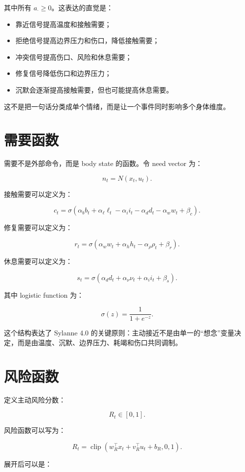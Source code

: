 \documentclass[UTF8,12pt]{ctexart}
\begin{document}
其中所有 $a_{\cdot}\geq 0$。这表达的直觉是：

\begin{itemize}
  \item 靠近信号提高温度和接触需要；
  \item 拒绝信号提高边界压力和伤口，降低接触需要；
  \item 冲突信号提高伤口、风险和休息需要；
  \item 修复信号降低伤口和边界压力；
  \item 沉默会逐渐提高接触需要，但也可能提高休息需要。
\end{itemize}

这不是把一句话分类成单个情绪，而是让一个事件同时影响多个身体维度。

\section{需要函数}

需要不是外部命令，而是 body state 的函数。令 need vector 为：

\[
n_t=N(x_t,u_t).
\]

接触需要可以定义为：

\[
c_t=\sigma\left(\alpha_b b_t+\alpha_\ell\ell_t-\alpha_i i_t-\alpha_d d_t-\alpha_w w_t+\beta_c\right).
\]

修复需要可以定义为：

\[
r_t=\sigma\left(\alpha_w w_t+\alpha_h h_t-\alpha_\rho\rho_t+\beta_r\right).
\]

休息需要可以定义为：

\[
s_t=\sigma\left(\alpha_d d_t+\alpha_\nu\nu_t+\alpha_i i_t+\beta_s\right).
\]

其中 logistic function 为：

\[
\sigma(z)=\frac{1}{1+e^{-z}}.
\]

这个结构表达了 Sylanne 4.0 的关键原则：主动接近不是由单一的“想念”变量决定，而是由温度、沉默、边界压力、耗竭和伤口共同调制。

\section{风险函数}

定义主动风险分数：

\[
R_t\in[0,1].
\]

风险函数可以写为：

\[
R_t=\operatorname{clip}\left(w_R^\top x_t+v_R^\top u_t+b_R,0,1\right).
\]

展开后可以是：
\end{document}
